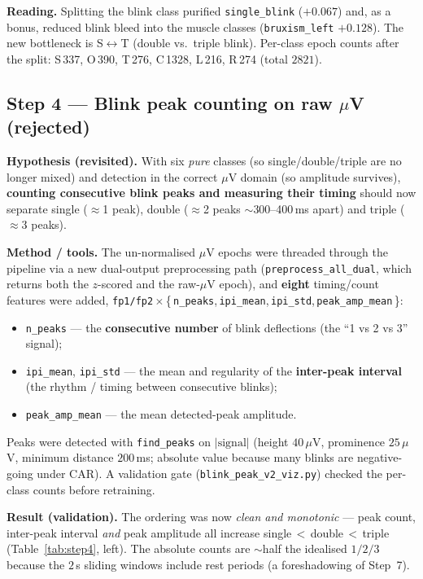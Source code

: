 \documentclass[11pt,a4paper]{article}
\newcommand{\up}[1]{\textcolor{good}{$+#1$}}
\newcommand{\muv}{$\mu$V}
\newcommand{\code}[1]{\texttt{#1}}
\begin{document}
\noindent
\textbf{Reading.} Splitting the blink class purified \code{single\_blink}
(\up{0.067}) and, as a bonus, reduced blink bleed into the muscle classes
(\code{bruxism\_left} \up{0.128}). The new bottleneck is S$\leftrightarrow$T
(double vs.\ triple blink). Per-class epoch counts after the split:
S\,337, O\,390, T\,276, C\,1328, L\,216, R\,274 (total $2821$).

\subsection{Step 4 --- Blink peak counting on raw \muv{} (rejected)}
\label{sec:step4}
\textbf{Hypothesis (revisited).} With six \emph{pure} classes (so
single/double/triple are no longer mixed) and detection in the correct \muv{}
domain (so amplitude survives), \textbf{counting consecutive blink peaks and
measuring their timing} should now separate single ($\approx$1 peak),
double ($\approx$2 peaks $\sim$300--400\,ms apart) and triple ($\approx$3 peaks).

\textbf{Method / tools.} The un-normalised \muv{} epochs were threaded through
the pipeline via a new dual-output preprocessing path
(\code{preprocess\_all\_dual}, which returns both the $z$-scored and the raw-\muv{}
epoch), and \textbf{eight} timing/count features were added,
\code{fp1/fp2}\,$\times$\,\{\,\code{n\_peaks},\,\code{ipi\_mean},\,\code{ipi\_std},\,\code{peak\_amp\_mean}\,\}:
\begin{itemize}[noitemsep]
  \item \code{n\_peaks} --- the \textbf{consecutive number} of blink deflections
  (the ``1 vs 2 vs 3'' signal);
  \item \code{ipi\_mean}, \code{ipi\_std} --- the mean and regularity of the
  \textbf{inter-peak interval} (the rhythm / timing between consecutive blinks);
  \item \code{peak\_amp\_mean} --- the mean detected-peak amplitude.
\end{itemize}
Peaks were detected with \code{find\_peaks} on $|\text{signal}|$ (height
$40$\,\muv, prominence $25$\,\muv, minimum distance $200$\,ms; absolute value
because many blinks are negative-going under CAR). A validation gate
(\code{blink\_peak\_v2\_viz.py}) checked the per-class counts before retraining.

\textbf{Result (validation).} The ordering was now \emph{clean and monotonic} ---
peak count, inter-peak interval \emph{and} peak amplitude all increase
single\,$<$\,double\,$<$\,triple (Table~\ref{tab:step4}, left). The absolute
counts are $\sim$half the idealised $1/2/3$ because the $2$\,s sliding windows
include rest periods (a foreshadowing of Step~7).
\end{document}
